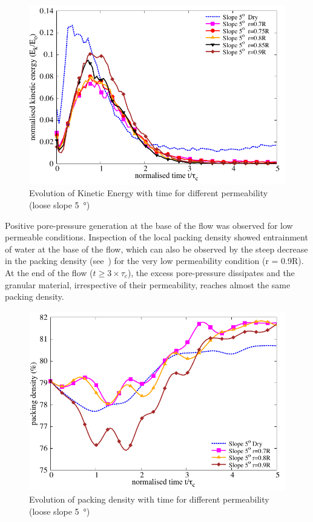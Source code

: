 \begin{figure}
\centering
\includegraphics[width=0.97\columnwidth]{KE_loose_5_slope}
\caption{Evolution of Kinetic Energy with time for different permeability (loose slope \SI{5}{\degree})}
\label{fig:KE5}
\end{figure}

Positive pore-pressure generation at the base of the flow was observed for low 
permeable conditions. Inspection of the local packing density showed 
entrainment of water at the base of the flow, which can also be observed by the 
steep decrease in the packing density (see~) for the very low 
permeability condition (r = 0.9R). At the end of the flow ($t \ge 3 \times 
\tau_c$), the excess pore-pressure dissipates and the granular material, 
irrespective of their permeability, reaches almost the same packing density.

\begin{figure}
\centering
\includegraphics[width=0.97\columnwidth]{Voronoi_5}
\caption{Evolution of packing density with time for different permeability (loose slope \SI{5}{\degree})}
\label{fig:voro5}
\end{figure}

